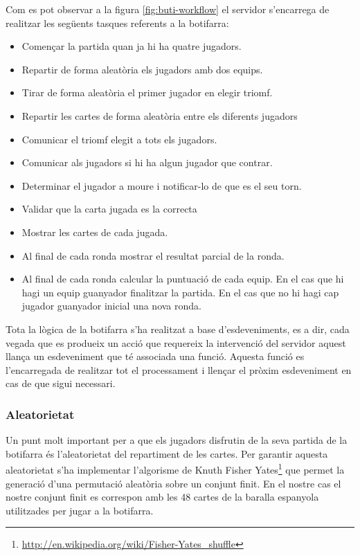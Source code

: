 \newpage

Com es pot observar a la figura \ref{fig:buti-workflow} el servidor s'encarrega de realitzar les següents tasques referents a la botifarra: 

\begin{itemize}
\item{Començar la partida quan ja hi ha quatre jugadors. }
\item{Repartir de forma aleatòria els jugadors amb dos equips. }
\item{Tirar de forma aleatòria el primer jugador en elegir triomf.}
\item{Repartir les cartes de forma aleatòria entre els diferents jugadors}
\item{Comunicar el triomf elegit a tots els jugadors.}
\item{Comunicar als jugadors si hi ha algun jugador que contrar.}
\item{Determinar el jugador a moure i notificar-lo de que es el seu torn.}
\item{Validar que la carta jugada es la correcta}
\item{Mostrar les cartes de cada jugada.}
\item{Al final de cada ronda mostrar el resultat parcial de la ronda. }
\item{Al final de cada ronda calcular la puntuació de cada equip. En el cas que hi hagi un equip guanyador finalitzar la partida. En el cas que no hi hagi cap jugador guanyador inicial una nova ronda.}
\end{itemize}

Tota la lògica de la botifarra s'ha realitzat a base d'esdeveniments, es a dir, cada vegada que es produeix un acció que requereix la intervenció del servidor aquest llança un esdeveniment que té associada una funció. Aquesta funció es l'encarregada de realitzar tot el processament i llençar el pròxim esdeveniment en cas de que sigui necessari.  


\subsubsection{Aleatorietat}

Un punt molt important per a que els jugadors disfrutin de la seva partida de la botifarra és l'aleatorietat del repartiment de les cartes. Per garantir aquesta aleatorietat s'ha implementar l'algorisme de Knuth Fisher Yates\footnote{\url{http://en.wikipedia.org/wiki/Fisher-Yates_shuffle}} que permet la generació d'una permutació aleatòria sobre un conjunt finit. En el nostre cas el nostre conjunt finit es correspon amb les 48 cartes de la baralla espanyola utilitzades per jugar a la botifarra. 

